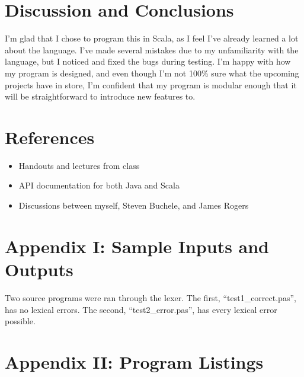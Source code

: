 \documentclass[paper=letter, fontsize=11pt, oneside, titlepage]{scrartcl}
\newcommand{\datalisting}[2][]{
    
}
\newcommand{\filelisting}[2][]{
    
}
\begin{document}
\section{Discussion and Conclusions}\label{conclusions}

I'm glad that I chose to program this in Scala, as I feel I've already learned a lot about the language.  I've made several mistakes due to my unfamiliarity with the language, but I noticed and fixed the bugs during testing.  I'm happy with how my program is designed, and even though I'm not 100\% sure what the upcoming projects have in store, I'm confident that my program is modular enough that it will be straightforward to introduce new features to.

\section{References}\label{ref}

\begin{itemize}
    \item Handouts and lectures from class
    \item API documentation for both Java and Scala
    \item Discussions between myself, Steven Buchele, and James Rogers
\end{itemize}

\section{Appendix I: Sample Inputs and Outputs}\label{sample}

Two source programs were ran through the lexer. The first, ``test1\_correct.pas'', has no lexical errors.  The second, ``test2\_error.pas'', has every lexical error possible.

\filelisting[language=pascal]{test1_correct.pas}
\filelisting{test1_correct.pas.listing}
\filelisting{test1_correct.pas.tokens}
\filelisting[language=pascal]{test2_errors.pas}
\filelisting{test2_errors.pas.listing}
\filelisting{test2_errors.pas.tokens}

\section{Appendix II: Program Listings}\label{code}

\datalisting{operators.dat}
\datalisting{punctuation.dat}
\datalisting{reservedwords.dat}
\end{document}
